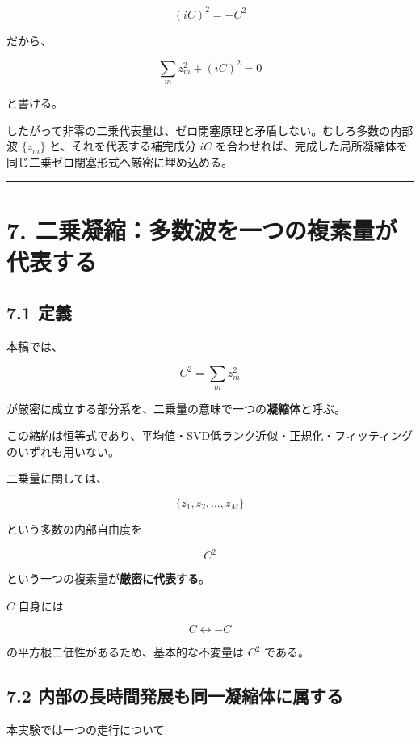 \documentclass[
  a4paper,
]{ltjsarticle}
\begin{document}
\[
(iC)^2=-C^2
\]

だから、

\[
\boxed{
\sum_m z_m^2+(iC)^2=0
}
\]

と書ける。

したがって非零の二乗代表量は、ゼロ閉塞原理と矛盾しない。むしろ多数の内部波
\(\{z_m\}\) と、それを代表する補完成分 \(iC\)
を合わせれば、完成した局所凝縮体を同じ二乗ゼロ閉塞形式へ厳密に埋め込める。

\begin{center}\rule{0.5\linewidth}{0.5pt}\end{center}

\section{7.
二乗凝縮：多数波を一つの複素量が代表する}\label{ux4e8cux4e57ux51ddux7e2eux591aux6570ux6ce2ux3092ux4e00ux3064ux306eux8907ux7d20ux91cfux304cux4ee3ux8868ux3059ux308b}

\subsection{7.1 定義}\label{ux5b9aux7fa9}

本稿では、

\[
C^2=\sum_m z_m^2
\]

が厳密に成立する部分系を、二乗量の意味で一つの\textbf{凝縮体}と呼ぶ。

この縮約は恒等式であり、平均値・SVD低ランク近似・正規化・フィッティングのいずれも用いない。

二乗量に関しては、

\[
\{z_1,z_2,\ldots,z_M\}
\]

という多数の内部自由度を

\[
\boxed{C^2}
\]

という一つの複素量が\textbf{厳密に代表する}。

\(C\) 自身には

\[
C\leftrightarrow -C
\]

の平方根二価性があるため、基本的な不変量は \(C^2\) である。

\subsection{7.2
内部の長時間発展も同一凝縮体に属する}\label{ux5185ux90e8ux306eux9577ux6642ux9593ux767aux5c55ux3082ux540cux4e00ux51ddux7e2eux4f53ux306bux5c5eux3059ux308b}

本実験では一つの走行について
\end{document}
